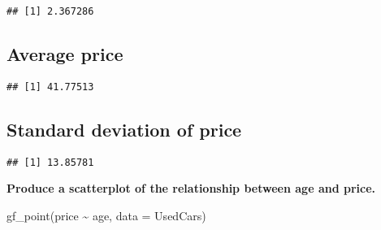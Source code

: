 \documentclass[
]{article}
\newenvironment{Shaded}{\begin{snugshade}}{\end{snugshade}}
\newcommand{\AttributeTok}[1]{\textcolor[rgb]{0.77,0.63,0.00}{#1}}
\newcommand{\FunctionTok}[1]{\textcolor[rgb]{0.00,0.00,0.00}{#1}}
\newcommand{\NormalTok}[1]{#1}
\newcommand{\SpecialCharTok}[1]{\textcolor[rgb]{0.00,0.00,0.00}{#1}}
\begin{document}
\begin{Shaded}
\end{Shaded}

\begin{verbatim}
## [1] 2.367286
\end{verbatim}

\hypertarget{average-price}{%
\subsection{Average price}\label{average-price}}

\begin{Shaded}
\end{Shaded}

\begin{verbatim}
## [1] 41.77513
\end{verbatim}

\hypertarget{standard-deviation-of-price}{%
\subsection{Standard deviation of
price}\label{standard-deviation-of-price}}

\begin{Shaded}
\end{Shaded}

\begin{verbatim}
## [1] 13.85781
\end{verbatim}

\textbf{Produce a scatterplot of the relationship between age and
price.}

\begin{Shaded}
\begin{Highlighting}[]
\FunctionTok{gf\_point}\NormalTok{(price }\SpecialCharTok{\textasciitilde{}}\NormalTok{ age, }\AttributeTok{data =}\NormalTok{ UsedCars)}
\end{Highlighting}
\end{Shaded}
\end{document}
